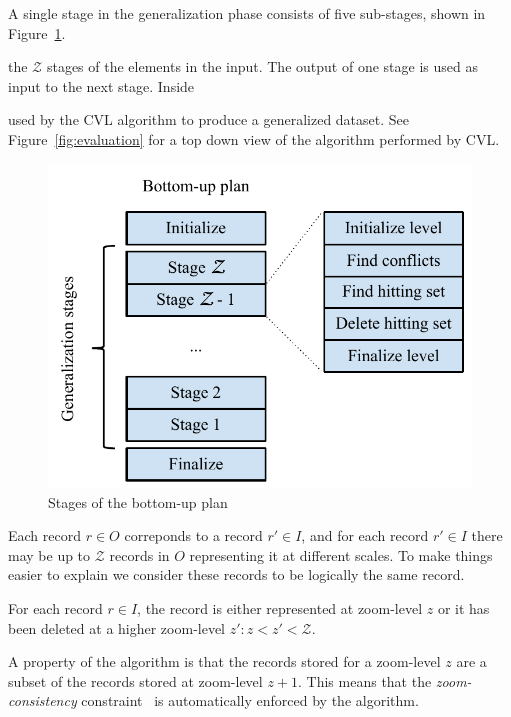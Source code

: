 A single stage in the generalization phase consists of five sub-stages, shown in Figure~\ref{fig:stages}.

 the $\mathcal{Z}$ stages   of the elements in the input. The output of one stage is used as input to the next stage. Inside 


used by the CVL algorithm to produce a generalized dataset. See Figure~\ref{fig:evaluation} for a top down view of the algorithm performed by CVL.

\begin{figure}[htbp]
\begin{center}
\includegraphics[scale=.75]{figs/cvl_stages.pdf}
\caption{Stages of the bottom-up plan}
\label{fig:stages}
\end{center}
\end{figure}

Each record $r \in O$ correponds to a record $r' \in I$, and for each record $r' \in I$ there may be up to $\mathcal{Z}$ records in $O$ representing it at different scales. To make things easier to explain we consider these records to be logically the same record.

For each record $r \in I$, the record is either represented at zoom-level $z$ or it has been deleted at a higher zoom-level $z': z < z' < \mathcal{Z}$.

A property of the algorithm is that the records stored for a zoom-level $z$ are a subset of the records stored at zoom-level $z+1$. This means that the \emph{zoom-consistency} constraint~\cite{fusiontables} is automatically enforced by the algorithm.


